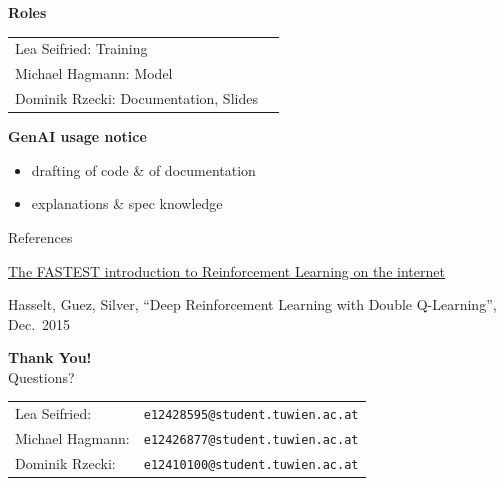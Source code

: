 \documentclass[aspectratio=169]{beamer}
\begin{document}
\begin{frame}[plain]
    \begin{center}
      \textbf{Roles} \\
      \vspace{0.3em}
      \begin{tabular}{ll}
        Lea Seifried:     Training \\[0.3em]
        Michael Hagmann:  Model \\[0.3em]
        Dominik Rzecki:   Documentation, Slides \\
      \end{tabular}

      \vspace{1.0em}

      \textbf{GenAI usage notice} \\
      \vspace{0.3em}
      \begin{itemize}
        \item drafting of code \& of documentation
        \item explanations \& spec knowledge
      \end{itemize}
    \end{center}
\end{frame}

\begin{frame}{References}
  \begin{center}
    \href{https://www.youtube.com/watch?v=VnpRp7ZglfA}
         {The FASTEST introduction to Reinforcement Learning on the internet}

    \vspace{0.5em}

    Hasselt, Guez, Silver, ``Deep Reinforcement Learning with Double Q-Learning'', Dec.~2015
  \end{center}
\end{frame}

\begin{frame}[plain]
  \begin{center}
    {\Large \textbf{Thank You!}}\\[1.5em]
    \large Questions?\\[2em]
    \normalsize
    \begin{tabular}{ll}
      Lea Seifried:     & \texttt{e12428595@student.tuwien.ac.at} \\[0.3em]
      Michael Hagmann:  & \texttt{e12426877@student.tuwien.ac.at} \\[0.3em]
      Dominik Rzecki:   & \texttt{e12410100@student.tuwien.ac.at} \\
    \end{tabular}
  \end{center}
\end{frame}
\end{document}
